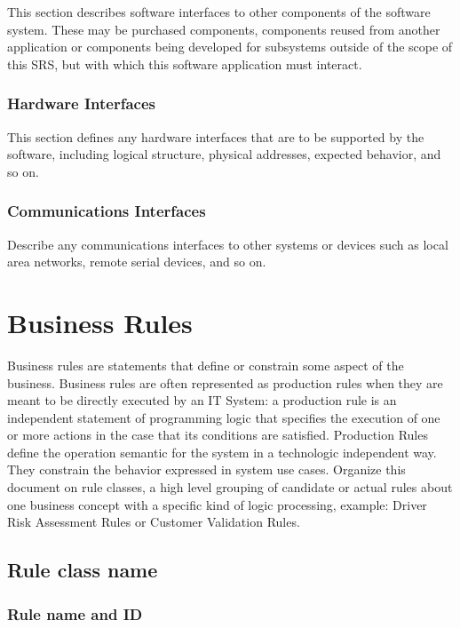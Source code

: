 This section describes software interfaces to other components of the software system. These may be purchased components, components reused from another application or components being developed for subsystems outside of the scope of this SRS, but with which this software application must interact.

\subsubsection{Hardware Interfaces}

This section defines any hardware interfaces that are to be supported by the software, including logical structure, physical addresses, expected behavior, and so on.

\subsubsection{Communications Interfaces}

Describe any communications interfaces to other systems or devices such as local area networks, remote serial devices, and so on.

\section{Business Rules}

Business rules are statements that define or constrain some aspect of the business. Business rules are often represented as production rules when they are meant to be directly executed by an IT System: a production rule is an independent statement of programming logic that specifies the execution of one or more actions in the case that its conditions are satisfied. Production Rules define the operation semantic for the system in a technologic independent way. They constrain the behavior expressed in system use cases.
Organize this document on rule classes, a high level grouping of candidate or actual rules about one business concept with a specific kind of logic processing, example: Driver Risk Assessment Rules or Customer Validation Rules.


\subsection{Rule class name}

\subsubsection{Rule name and ID}

